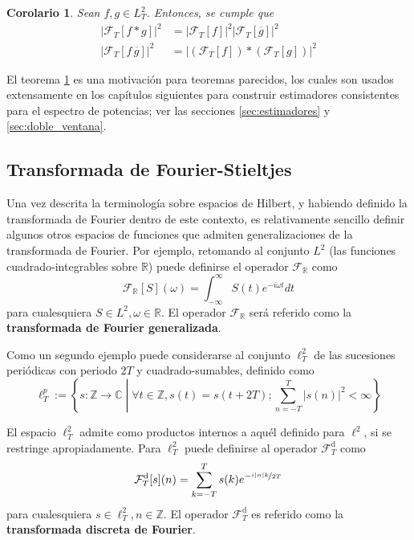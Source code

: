 \documentclass[12pt,letterpaper,draft]{book}
\newtheorem{corolario}[teorema]{Corolario}
\newcommand{\R}{\mathbb{R}}
\newcommand{\C}{\mathbb{C}}
\newcommand{\Z}{\mathbb{Z}}
\newcommand{\intR}{\int_{-\infty}^{\infty}}
\newcommand{\abso}[1]{\left| #1 \right|}
\newcommand{\talque}{\mathrel{}\middle|\mathrel{}}
\begin{document}
\begin{corolario}
Sean $f, g \in L^{2}_T$. Entonces, se cumple que
\begin{align}
\abso{\mathcal{F}_T[f \ast g]}^{2} &= \abso{ \mathcal{F}_T[f] }^{2} \abso{ \mathcal{F}_T[\overline{g}] }^{2} \\
\abso{\mathcal{F}_T[ f\, \overline{g}]}^{2} &= \abso{ \left( \mathcal{F}_T[f] \right) \ast \left( \mathcal{F}_T[g] \right)}^{2}
\end{align}
\label{teo:convolucion}
\end{corolario}

El teorema \ref{teo:convolucion} es una motivación para teoremas parecidos, los cuales son usados extensamente en los capítulos siguientes para construir estimadores consistentes para el espectro de potencias; ver las secciones \ref{sec:estimadores} y \ref{sec:doble_ventana}.


\subsection{Transformada de Fourier-Stieltjes}

Una vez descrita la terminología sobre espacios de Hilbert, y habiendo definido la transformada de Fourier dentro de este contexto, es relativamente sencillo definir algunos otros espacios de funciones que admiten generalizaciones de la transformada de Fourier.
%
Por ejemplo, retomando al conjunto $L^{2}$  (las funciones cuadrado-integrables sobre $\R$) puede definirse el operador $\mathcal{F}_\R$ como
\begin{equation}
\mathcal{F}_\R[S](\omega) = \intR S(t) e^{-{ i \omega t}} dt
\end{equation}
para cualesquiera $S \in L^{2}, \omega \in \R$. El operador $\mathcal{F}_\R$ será referido como la \textbf{transformada de Fourier generalizada}.

Como un segundo ejemplo puede considerarse al conjunto $\ell^{2}_T$ de las sucesiones periódicas con periodo $2T$ y cuadrado-sumables, definido como
\begin{equation}
\ell^{p}_T := \left\{ s: \Z\rightarrow\C \talque \forall t\in \Z, s(t) = s(t+2T) ; \sum_{n=-T}^{T} \abso{s(n)}^{2} < \infty \right\}
\end{equation}

El espacio $\ell^{2}_T$ admite como productos internos a aquél definido para $\ell^{2}$, si se restringe apropiadamente.
%
Para $\ell^{2}_T$ puede definirse al operador $\mathcal{F}_T^{\text{d}}$ como
\begin{equation}
\mathcal{F}_T^{\text{d}}[s](n) = \sum_{k=-T}^{T} s(k) e^{-\nicefrac{ i \abso{n} k}{2T}}
\end{equation}
para cualesquiera $s \in \ell^{2}_T, n \in \Z$. El operador $\mathcal{F}_T^{\text{d}}$ es referido como la \textbf{transformada discreta de Fourier}.
\end{document}
